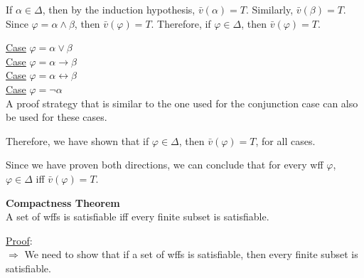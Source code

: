 \documentclass[12pt]{article}	%
\begin{document}
\begin{flushleft}
\vspace{2mm}

If $\alpha \in \Delta$, then by the induction hypothesis, $\bar{v}(\alpha) = T$. Similarly, $\bar{v}(\beta) = T$. Since $\varphi = \alpha \wedge \beta$, then $\bar{v}(\varphi) = T$. Therefore, if $\varphi \in \Delta$, then $\bar{v}(\varphi) = T$. \\

\vspace{2mm}

\underline{Case} $\varphi = \alpha \vee \beta$ \\
\underline{Case} $\varphi = \alpha \rightarrow \beta$ \\
\underline{Case} $\varphi = \alpha \leftrightarrow \beta$ \\
\underline{Case} $\varphi = \neg\alpha$ \\
A proof strategy that is similar to the one used for the conjunction case can also be used for these cases.

\vspace{2mm}

Therefore, we have shown that if $\varphi \in \Delta$, then $\bar{v}(\varphi) = T$, for all cases.

\vspace{2mm}

Since we have proven both directions, we can conclude that for every wff $\varphi$, $\varphi \in \Delta$ iff $\bar{v}(\varphi) = T$. \\




\vspace{10mm}




\textbf{Compactness Theorem} \\
A set of wffs is satisfiable iff every finite subset is satisfiable. \\

\vspace{5mm}

\underline{Proof}: \\
$\Rightarrow$ We need to show that if a set of wffs is satisfiable, then every finite subset is satisfiable. \\

\vspace{2mm}


\end{flushleft}
\end{document}
